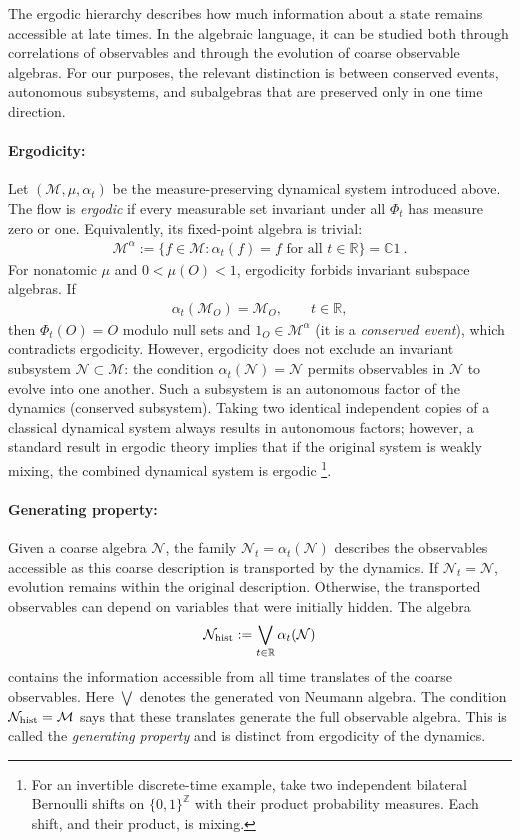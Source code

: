 \documentclass[a4paper,11pt]{article}
\theoremstyle{definition}
\begin{document}
The ergodic hierarchy describes how much information about a state remains accessible at late times. In the algebraic language, it can be studied both through correlations of observables and through the evolution of coarse observable algebras. For our purposes, the relevant distinction is between conserved events, autonomous subsystems, and subalgebras that are preserved only in one time direction.

\paragraph{Ergodicity:}
Let $(\mathcal M,\mu,\alpha_t)$ be the measure-preserving dynamical system introduced above. The flow is {\it ergodic} if every measurable set invariant under all $\Phi_t$ has measure zero or one. Equivalently, its fixed-point algebra is trivial:
\begin{align}
    \mathcal M^\alpha
    :=\{f\in\mathcal M:\alpha_t(f)=f\text{ for all }t\in\mathbb R\}
    =\mathbb C1\ .
\end{align}
For nonatomic $\mu$ and $0<\mu(O)<1$, ergodicity forbids invariant subspace algebras. If
\begin{align}
    \alpha_t(\mathcal M_O)=\mathcal M_O,\qquad t\in\mathbb R,
\end{align}
then $\Phi_t(O)=O$ modulo null sets and $1_O\in\mathcal M^\alpha$ (it is a {\it conserved event}), which contradicts ergodicity. However, ergodicity does not exclude an invariant subsystem $\mathcal N\subset\mathcal M$: the condition $\alpha_t(\mathcal N)=\mathcal N$ permits observables in $\mathcal N$ to evolve into one another. Such a subsystem is an autonomous factor of the dynamics (conserved subsystem). Taking two identical independent copies of a classical dynamical system always results in autonomous factors; however, a standard result in ergodic theory implies that if the original system is weakly mixing, the combined dynamical system is ergodic \footnote{For an invertible discrete-time example, take two independent bilateral Bernoulli shifts on $\{0,1\}^{\mathbb Z}$ with their product probability measures. Each shift, and their product, is mixing.}.

\paragraph{Generating property:}
Given a coarse algebra $\mathcal N$, the family $\mathcal N_t=\alpha_t(\mathcal N)$ describes the observables accessible as this coarse description is transported by the dynamics. If $\mathcal N_t=\mathcal N$, evolution remains within the original description. Otherwise, the transported observables can depend on variables that were initially hidden. The algebra
\begin{align}
    \mathcal N_{\rm hist}:=\bigvee_{t\in\mathbb R}\alpha_t(\mathcal N)
\end{align}
contains the information accessible from all time translates of the coarse observables. Here $\bigvee$ denotes the generated von Neumann algebra. The condition $\mathcal N_{\rm hist}=\mathcal M$ says that these translates generate the full observable algebra. This is called the {\it generating property} and is distinct from ergodicity of the dynamics.
\end{document}
